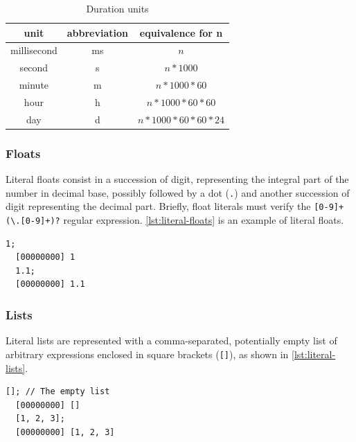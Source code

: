 \documentclass[openright,twoside,12pt]{report}
\newcommand{\lst}[1]{\autoref{lst:#1}}
\begin{document}
\begin{table}[htp]
  \caption{Duration units}
  \label{tab:durations}
  \centering
  \begin{tabular}{|c|c|c|}
    \hline
    unit        & abbreviation & equivalence for n         \\
    \hline
    millisecond & ms           & $n$                       \\
    second      & s            & $n * 1000$                \\
    minute      & m            & $n * 1000 * 60$           \\
    hour        & h            & $n * 1000 * 60 * 60$      \\
    day         & d            & $n * 1000 * 60 * 60 * 24$ \\
    \hline
  \end{tabular}
\end{table}

\subsubsection{Floats}
\label{sect-syn-lit-flo}

Literal floats consist in a succession of digit, representing the
integral part of the number in decimal base, possibly followed by a
dot (\lstinline|.|) and another succession of digit representing the
decimal part. Briefly, float literals must verify the
\lstinline|[0-9]+(\.[0-9]+)?| regular expression. \lst{literal-floats}
is an example of literal floats.

\begin{lstlisting}[caption=Literal floats,label=lst:literal-floats,float=htp]
  1;
  [00000000] 1
  1.1;
  [00000000] 1.1
\end{lstlisting}

\subsubsection{Lists}

Literal lists are represented with a comma-separated, potentially
empty list of arbitrary expressions enclosed in square brackets
(\lstinline|[]|), as shown in \lst{literal-lists}.

\begin{lstlisting}[caption=Literal lists,label=lst:literal-lists,float=htp]
  []; // The empty list
  [00000000] []
  [1, 2, 3];
  [00000000] [1, 2, 3]
\end{lstlisting}
\end{document}
